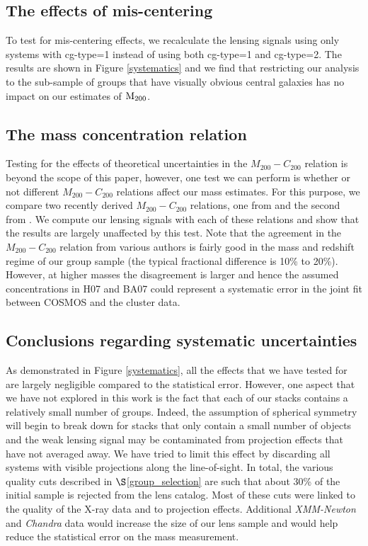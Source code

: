 \documentclass[12pt]{emulateapj}
\begin{document}
\subsection{The effects of mis-centering}

To test for mis-centering effects, we recalculate the lensing signals
using only systems with {\sc cg-type}=1 instead of using both {\sc
  cg-type}=1 and {\sc cg-type}=2. The results are shown in Figure
\ref{systematics} and we find that restricting our analysis to the
sub-sample of groups that have visually obvious central galaxies has
no impact on our estimates of $\rm{M}_{\rm 200}$.

\subsection{The mass concentration relation}

Testing for the effects of theoretical uncertainties in the
$M_{200}-C_{200}$ relation is beyond the scope of this paper, however,
one test we can perform is whether or not different $M_{200}-C_{200}$
relations affect our mass estimates. For this purpose, we compare two
recently derived $M_{200}-C_{200}$ relations, one from
\citet{Maccio:2007} and the second from \citet{Zhao:2008}. We compute
our lensing signals with each of these relations and show that the
results are largely unaffected by this test. Note that the agreement
in the $M_{200}-C_{200}$ relation from various authors is fairly good
in the mass and redshift regime of our group sample (the typical
fractional difference is 10\% to 20\%). However, at higher masses the
disagreement is larger and hence the assumed concentrations in H07 and
BA07 could represent a systematic error in the joint fit between
COSMOS and the cluster data.

\subsection{Conclusions regarding systematic uncertainties}

As demonstrated in Figure \ref{systematics}, all the effects that we
have tested for are largely negligible compared to the statistical
error. However, one aspect that we have not explored in this work is
the fact that each of our stacks contains a relatively small number of
groups. Indeed, the assumption of spherical symmetry will begin to
break down for stacks that only contain a small number of objects and
the weak lensing signal may be contaminated from projection effects
that have not averaged away. We have tried to limit this effect by
discarding all systems with visible projections along the
line-of-sight. In total, the various quality cuts described in
$\S$\ref{group_selection} are such that about 30\% of the initial
sample is rejected from the lens catalog. Most of these cuts were
linked to the quality of the X-ray data and to projection
effects. Additional {\sl XMM-Newton} and {\sl Chandra} data would
increase the size of our lens sample and would help reduce the
statistical error on the mass measurement.
\end{document}
